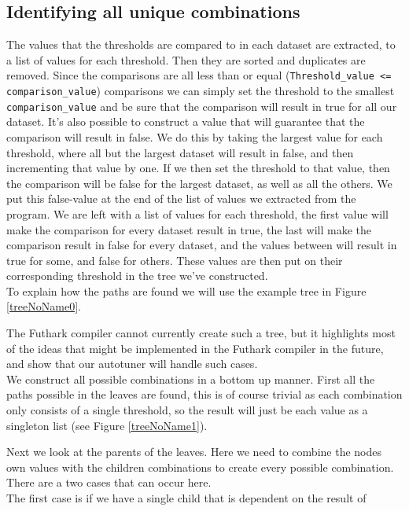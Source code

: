 \subsection{Identifying all unique combinations}
The values that the thresholds are compared to in each dataset are extracted,
to a list of values for each threshold. Then they are sorted and duplicates are
removed. Since the comparisons are all less than or equal
(\texttt{Threshold\_value <= comparison\_value}) comparisons we can simply
set the threshold to the smallest \texttt{comparison\_value} and be sure that the comparison
will result in true for all our dataset. It's also possible to construct a
value that will guarantee that the comparison will result in false. We do this
by taking the largest value for each threshold, where all but the largest
dataset will result in false, and then incrementing that value by one. If we then set the threshold to that value, then the comparison will be false for the largest dataset, as well as all the others. We put this false-value at
the end of the list of values we extracted from the program. We are left with a
list of values for each threshold, the first value will make the comparison for
every dataset result in true, the last will make the comparison result in false
for every dataset, and the values between will result in true for some, and
false for others. These values are then put on their corresponding threshold in
the tree we've constructed.
\\
To explain how the paths are found we will use the example tree in Figure \ref{treeNoName0}.

The Futhark compiler cannot currently create such a tree, but
it highlights most of the ideas that might be implemented in the Futhark
compiler in the future, and show that our autotuner will handle such cases. \\
We construct all possible combinations in a bottom up manner. First
all the paths possible in the leaves are found, this is of course trivial as
each combination only consists of a single threshold, so the result will just
be each value as a singleton list (see Figure \ref{treeNoName1}).

Next we look at the parents of the leaves. Here we need to combine the nodes
own values with the children combinations to create every possible
combination. There are a two cases that can occur here. \\
The first case is if we have a single child that is dependent on the result of
